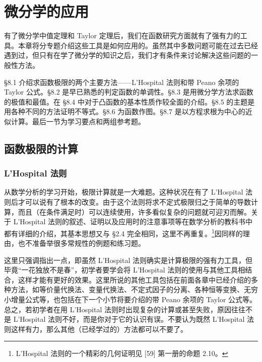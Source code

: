 \chapter{微分学的应用}


有了微分学中值定理和 Taylor 定理后，我们在函数研究方面就有了强有力的工具。本章将分专题介绍这些工具是如何应用的。虽然其中多数问题可能在过去已经遇到过，但只有在学了微分学的知识之后，我们才有条件来讨论解决这些问题的一般性方法。

§8.1 介绍求函数极限的两个主要方法——L'Hospital 法则和带 Peano 余项的 Taylor 公式。§8.2 是早已熟悉的判定函数的单调性。§8.3 是用微分学方法求函数的极值和最值。在 §8.4 中对于凸函数的基本性质作较全面的介绍。§8.5 的主题是用各种不同的方法证明不等式。§8.6 为函数作图。§8.7 是以方程求根为中心的近似计算。最后一节为学习要点和两组参考题。

\section{函数极限的计算}

\subsection{L'Hospital 法则}

从数学分析的学习开始，极限计算就是一大难题。这种状况在有了 L'Hospital 法则后才可以说有了根本的改变。由于这个法则将求不定式极限归之于简单的导数计算，而且（在条件满足时）可以连续使用，许多看似复杂的问题就可迎刃而解。关于 L'Hospital 法则的叙述、证明以及应用时的注意事项等在数学分析的教科书中都有详细的介绍，其基本思想又与 §2.4 完全相同，这里不再重复。\footnote{L'Hospital 法则的一个精彩的几何证明见 [59] 第一册的命题 2.10。}因同样的理由，也不准备举很多常规性的例题和练习题。

这里只强调指出一点，即虽然 L'Hospital 法则确实是计算极限的强有力工具，但毕竟“一花独放不是春”，初学者要学会将 L'Hospital 法则的使用与其他工具相结合，这样才能有更好的效果。这里所说的其他工具包括在前面各章中已经介绍的多种方法，如等价量代换法、变量代换法、不定式因子的分离、各种恒等变换、无穷小增量公式等，也包括在下一个小节将要介绍的带 Peano 余项的 Taylor 公式等。总之，若初学者在用 L'Hospital 法则时出现复杂的计算或甚至失败，原因往往不是 L'Hospital 法则不好，而是你对于它的认识有误。不要认为既然 L'Hospital 法则这样有力，那么其他（已经学过的）方法都可以不要了。

